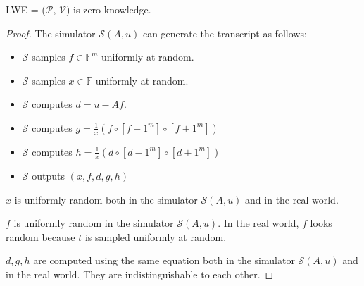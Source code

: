 \begin{lemma}
\label{lemma:lwezk}

LWE = ($\mathcal{P}$, $\mathcal{V}$) is zero-knowledge.

\end{lemma}
\begin{proof}

The simulator $\mathcal{S}(A, u)$ can generate the transcript as follows:

\begin{itemize}
    \item $\mathcal{S}$ samples $f \in \mathbb{F}^m$ uniformly at random.
    \item $\mathcal{S}$ samples $x \in \mathbb{F}$ uniformly at random.
    \item $\mathcal{S}$ computes $d = u - Af$.
    \item $\mathcal{S}$ computes $g = \frac{1}{x} (f \circ [f - 1^m] \circ [f + 1^m])$
    \item $\mathcal{S}$ computes $h = \frac{1}{x} (d \circ [d - 1^m] \circ [d + 1^m])$
    \item $\mathcal{S}$ outputs $(x, f, d, g, h)$
\end{itemize}

$x$ is uniformly random both in the simulator $\mathcal{S}(A, u)$ and in the real world. 

$f$ is uniformly random in the simulator $\mathcal{S}(A, u)$. In the real world, $f$ looks random because $t$ is sampled uniformly at random.

$d, g, h$ are computed using the same equation both in the simulator $\mathcal{S}(A, u)$ and in the real world. They are indistinguishable to each other.

\end{proof}